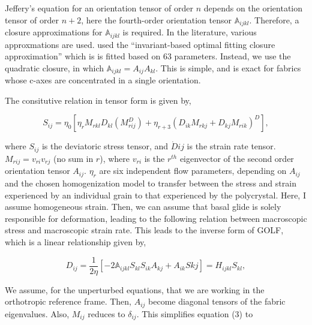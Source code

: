 \documentclass{article}
\begin{document}
Jeffery's equation for an orientation tensor of order $n$ depends on the orientation tensor of order $n+2$, here the fourth-order orientation tensor $\mathbb{A}_{ijkl}$. Therefore, a closure approximations for $\mathbb{A}_{ijkl}$ is required. In the literature, various approxmations are used. \citet{gillet2006} used the ``invariant-based optimal fitting closure approximation'' which is is fitted based on 63 parameters. Instead, we use the quadratic closure, in which $\mathbb{A}_{ijkl} = A_{ij} A_{kl}$. This is simple, and is exact for fabrics whose c-axes are concentrated in a single orientation. 

The consitutive relation in tensor form is given by,

\begin{equation}
S_{ij} = \eta_0 \left[ \eta_r M_{rkl} D_{kl} \left( M_{rij}^D \right)  + \eta_{r+3} \left( D_{ik} M_{rkj} + D_{kj} M_{rik} \right)^D \right],
\end{equation}

where $S_{ij}$ is the deviatoric stress tensor, and $\dot{D}{ij}$ is the strain rate tensor. $M_{rij} = v_{ri} v_{rj}$ (no sum in $r$), where $v_{ri}$ is the $r^{th}$ eigenvector of the second order orientation tensor $A_{ij}$. $\eta_r$ are six independent flow parameters, depending on $A_{ij}$ and the chosen homogenization model to transfer between the stress and strain experienced by an individual grain to that experienced by the polycrystal. Here, I assume homogeneous strain. Then, we can assume that basal glide is solely responsible for deformation, leading to the following relation between macroscopic stress and macroscopic strain rate. This leads to the inverse form of GOLF, which is a linear relationship given by,

\begin{equation}
   D_{ij} = \frac{1}{2 \eta} \left[ -2 \mathbb{A}_{ijkl}S_{kl}  S_{ik}A_{kj} + A_{ik}S{kj} \right] = H_{ijkl} S_{kl},
\end{equation}

We assume, for the unperturbed equations, that we are working in the orthotropic reference frame. Then, $A_{ij}$ become diagonal tensors of the fabric eigenvalues. Also, $M_{ij}$ reduces to $\delta_{ij}$. This simplifies equation (3) to 
\end{document}
